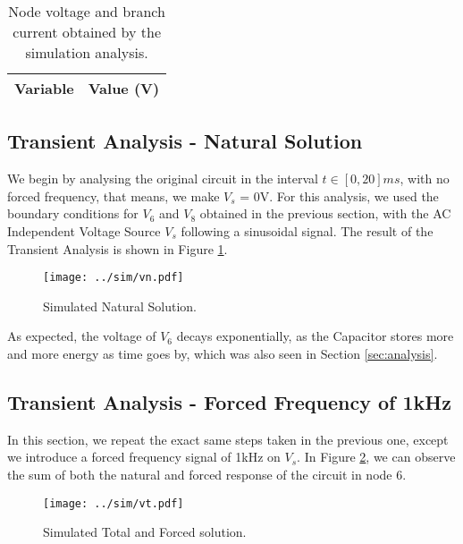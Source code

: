 \begin{table}[H]
  \centering
  \begin{tabular}{|l|r|}
    \hline
    {\bf Variable} & {\bf Value (V)} \\ \hline
    
  \end{tabular}
  \caption{Node voltage and branch current obtained by the simulation analysis.}
  \label{tab:sim2}
\end{table}

\newpage

\subsection{Transient Analysis - Natural Solution}
\label{subsec:trans_NS}

We begin by  analysing the original circuit in the interval $t \in [0, 20]ms$, with no forced frequency, that means, we make $V_s$ = 0V.
For this analysis, we used the boundary conditions for $V_6$ and $V_8$ obtained in the previous section, with the AC Independent Voltage Source $V_s$ following a sinusoidal signal. The result of the Transient Analysis is shown in Figure \ref{fig:sim-graph3}.

\begin{figure}[H] \centering
\texttt{[image: ../sim/vn.pdf]}
\caption{Simulated Natural Solution.}
\label{fig:sim-graph3}
\end{figure}

As expected, the voltage of $V_6$ decays exponentially, as the Capacitor stores more and more energy as time goes by, which was also seen in Section \ref{sec:analysis}.

\subsection{Transient Analysis - Forced Frequency of 1kHz}
\label{subsec:trans_FS}

In this section, we repeat the exact same steps taken in the previous one, except we introduce a forced frequency signal of 1kHz on $V_s$. In Figure \ref{fig:sim-graph4}, we can observe the sum of both the natural and forced response of the circuit in node 6.


\begin{figure}[H] \centering
\texttt{[image: ../sim/vt.pdf]}
\caption{Simulated Total and Forced solution.}
\label{fig:sim-graph4}
\end{figure}

